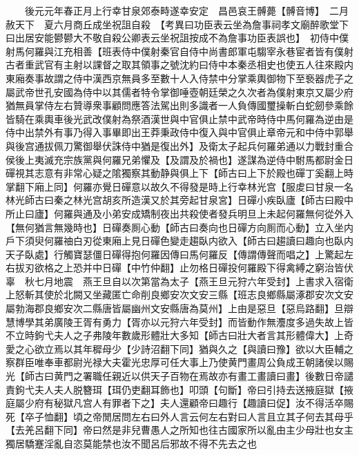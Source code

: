 　　後元元年春正月上行幸甘泉郊泰畤遂幸安定　昌邑哀王髆薨【髆音博】　二月赦天下　夏六月商丘成坐祝詛自殺　【考異曰功臣表云坐為詹事祠孝文廟醉歌堂下曰出居安能鬰鬰大不敬自殺公卿表云坐祝詛按成不為詹事功臣表誤也】　初侍中僕射馬何羅與江充相善【班表侍中僕射秦官自侍中尚書郎軍屯騶宰永巷宦者皆有僕射古者重武官有主射以課督之取其領事之號沈約曰侍中本秦丞相史也使五人往來殿内東廂奏事故謂之侍中漢西京無員多至數十人入侍禁中分掌乘輿御物下至䙝器虎子之屬武帝世孔安國為侍中以其儒者特令掌御唾壺朝廷榮之久次者為僕射東京又屬少府猶無員掌侍左右贊導衆事顧問應答法駕出則多識者一人負傳國璽操斬白蛇劒參乘餘皆騎在乘輿車後光武改僕射為祭酒漢世與中官俱止禁中武帝時侍中馬何羅為逆由是侍中出禁外有事乃得入事畢即出王莽秉政侍中復入與中官俱止章帝元和中侍中郭舉與後宫通拔佩刀驚御舉伏誅侍中猶是復出外】及衛太子起兵何羅弟通以力戰封重合侯後上夷滅充宗族黨與何羅兄弟懼及【及謂及於禍也】遂謀為逆侍中駙馬都尉金日磾視其志意有非常心疑之隂獨察其動静與俱上下【師古曰上下於殿也磾丁奚翻上時掌翻下廂上同】何羅亦覺日磾意以故久不得發是時上行幸林光宫【服䖍曰甘泉一名林光師古曰秦之林光宫胡亥所造漢又於其旁起甘泉宮】日磾小疾臥廬【師古曰殿中所止曰廬】何羅與通及小弟安成矯制夜出共殺使者發兵明旦上未起何羅無何從外入【無何猶言無幾時也】日磾奏厠心動【師古曰奏向也日磾方向厠而心動】立入坐内戶下須臾何羅䄂白刃從東廂上見日磾色變走趨臥内欲入【師古曰趨讀曰趣向也臥内天子臥處】行觸寶瑟僵日磾得抱何羅因傳曰馬何羅反【傳謂傳聲而唱之】上驚起左右拔刃欲格之上恐并中日磾【中竹仲翻】止勿格日磾投何羅殿下得禽縛之窮治皆伏辜　秋七月地震　燕王旦自以次第當為太子【燕王旦元狩六年受封】上書求入宿衛上怒斬其使於北闕又坐藏匿亡命削良鄉安次文安三縣【班志良鄉縣屬涿郡安次文安屬勃海郡良鄉安次二縣唐皆屬幽州文安縣唐為莫州】上由是惡旦【惡烏路翻】旦辯慧博學其弟廣陵王胥有勇力【胥亦以元狩六年受封】而皆動作無灋度多過失故上皆不立時鉤弋夫人之子弗陵年數歲形體壯大多知【師古曰壯大者言其形體偉大】上奇愛之心欲立焉以其年穉母少【少詩沼翻下同】猶與久之【與讀曰豫】欲以大臣輔之察群臣唯奉車都尉光禄大夫霍光忠厚可任大事上乃使黄門畫周公負成王朝諸侯以賜光【師古曰黄門之署職任親近以供天子百物在焉故亦有畫工畫讀曰畫】後數日帝譴責鉤弋夫人夫人脱簪珥【珥仍吏翻耳飾也】叩頭【句斷】帝曰引持去送掖庭獄【掖庭屬少府有秘獄凡宫人有罪者下之】夫人還顧帝曰趣行【趣讀曰促】汝不得活卒賜死【卒子恤翻】頃之帝閒居問左右曰外人言云何左右對曰人言且立其子何去其母乎【去羌呂翻下同】帝曰然是非兒曹愚人之所知也往古國家所以亂由主少母壯也女主獨居驕蹇淫亂自恣莫能禁也汝不聞呂后邪故不得不先去之也


